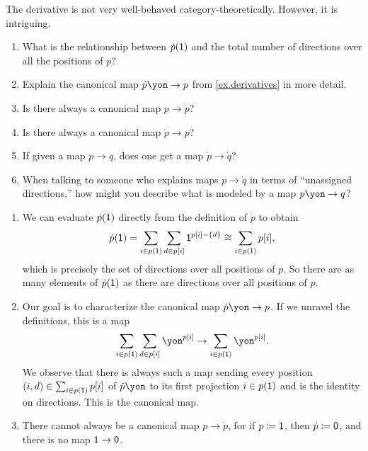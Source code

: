 \documentclass[Book-Poly]{subfiles}
\begin{document}
\begin{exercise}
The derivative is not very well-behaved category-theoretically. However, it is intriguing.
\begin{enumerate}
	\item What is the relationship between $\dot{p}(\textsf{1})$ and the total number of directions over all the positions of $p$?
	\item Explain the canonical map $\dot{p}\yon\to p$ from \cref{ex.derivatives} in more detail.
	\item Is there always a canonical map $p\to \dot{p}$?
	\item Is there always a canonical map $\dot{p}\to p$?
	\item If given a map $p\to q$, does one get a map $\dot{p}\to\dot{q}$?
	\item When talking to someone who explains maps $p\to\dot{q}$ in terms of ``unassigned directions,'' how might you describe what is modeled by a map $p\yon\to q$?
	\qedhere
\end{enumerate}
\begin{solution}
\begin{enumerate}
    \item We can evaluate $\dot{p}(\textsf{1})$ directly from the definition of $\dot{p}$ to obtain
    \[
        \dot{p}(\textsf{1}) = \sum_{i \in p(\textsf{1})} \sum_{d \in p[i]} \textsf{1}^{p[i]-\{d\}} \cong \sum_{i \in p(\textsf{1})} p[i],
    \]
    which is precisely the set of directions over all positions of $p$.
    So there are as many elements of $\dot{p}(\textsf{1})$ as there are directions over all positions of $p$.
    
	\item Our goal is to characterize the canonical map $\dot{p}\yon\to p$.
	If we unravel the definitions, this is a map
	\[
	    \sum_{i \in p(\1)} \sum_{d \in p[i]} \yon^{p[i]} \to \sum_{i \in p(\1)} \yon^{p[i]}.
	\]
	We observe that there is always such a map sending every position $(i, d) \in \sum_{i \in p(\textsf{1})} p[i]$ of $\dot{p}\yon$ to its first projection $i \in p(\textsf{1})$ and is the identity on directions.
	This is the canonical map.

	\item There cannot always be a canonical map $p\to \dot{p}$, for if $p \coloneqq \textsf{1}$, then $\dot{p} \coloneqq \textsf{0}$, and there is no map $\textsf{1} \to \textsf{0}$.
	

\end{enumerate}
\end{solution}
\end{exercise}
\end{document}
